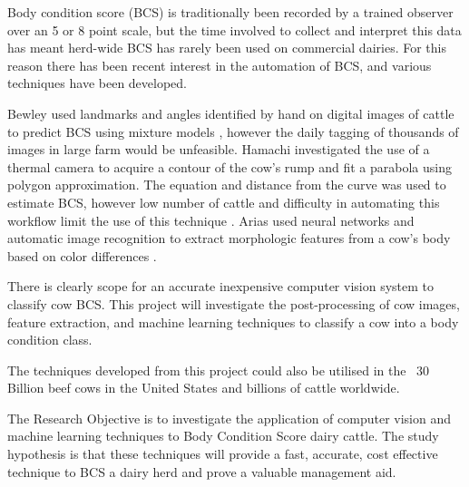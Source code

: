 \documentclass[11pt]{article}
\begin{document}
		Body condition score (BCS) is traditionally been recorded by a trained observer over an 5 or 8 point scale\cite{Bewley2010}, but the time involved to collect and interpret this data has meant herd-wide BCS has rarely been used on commercial dairies.
		For this reason there has been recent interest in the automation of BCS, and various techniques have been developed.



		Bewley used landmarks and angles identified by hand on digital images of cattle to predict BCS using mixture models \cite{Bewley2008}, however the daily tagging of thousands of images in large farm would be unfeasible.
		Hamachi investigated the use of a thermal camera to acquire a contour of the cow's rump and fit a parabola using polygon approximation. 
		The equation and distance from the curve was used to estimate BCS, however low number of cattle and difficulty in automating this workflow limit the use of this technique \cite{Halachmi2008}. 
		Arias used neural networks and automatic image recognition to extract morphologic features from a cow's body based on color differences \cite{Arias2004}. 


		There is clearly scope for an accurate inexpensive computer vision system to classify cow BCS.
		This project will investigate the post-processing of cow images, feature extraction, and machine learning techniques to classify a cow into a body condition class.  


		The techniques developed from this project could also be utilised in the ~30 Billion beef cows in the United States\cite{USDA2013} and billions of cattle worldwide.

		The Research Objective is to investigate the application of computer vision and machine learning techniques to Body Condition Score dairy cattle.
		The study hypothesis is that these techniques will provide a fast, accurate, cost effective technique to BCS a dairy herd and prove a valuable management aid.


\newpage
\end{document}
